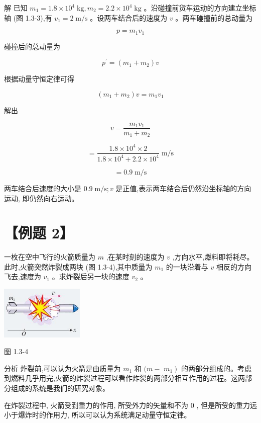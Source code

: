 \documentclass[10pt]{article}
\begin{document}
解 已知 \({m}_{1} = {1.8} \times {10}^{4}\mathrm{\;{kg}},{m}_{2} = {2.2} \times {10}^{4}\mathrm{\;{kg}}\) 。沿碰撞前货车运动的方向建立坐标轴 (图 1.3-3),有 \({v}_{1} = 2\mathrm{\;m}/\mathrm{s}\) 。设两车结合后的速度为 \(v\) 。两车碰撞前的总动量为

\[
p = {m}_{1}{v}_{1}
\]

碰撞后的总动量为

\[
{p}^{\prime } = \left( {{m}_{1} + {m}_{2}}\right) v
\]

根据动量守恒定律可得

\[
\left( {{m}_{1} + {m}_{2}}\right) v = {m}_{1}{v}_{1}
\]

解出

\[
v = \frac{{m}_{1}{v}_{1}}{{m}_{1} + {m}_{2}}
\]

\[
= \frac{{1.8} \times {10}^{4} \times 2}{{1.8} \times {10}^{4} + {2.2} \times {10}^{4}}\mathrm{\;m}/\mathrm{s}
\]

\[
= {0.9}\mathrm{\;m}/\mathrm{s}
\]

两车结合后速度的大小是 \({0.9}\mathrm{\;m}/\mathrm{s};v\) 是正值,表示两车结合后仍然沿坐标轴的方向运动, 即仍然向右运动。

\section*{【例题 2】}

一枚在空中飞行的火箭质量为 \(m\) ,在某时刻的速度为 \(v\) ,方向水平,燃料即将耗尽。此时,火箭突然炸裂成两块 (图 1.3-4),其中质量为 \({m}_{1}\) 的一块沿着与 \(v\) 相反的方向飞去,速度为 \({v}_{1}\) 。求炸裂后另一块的速度 \({v}_{2}\) 。

\begin{center}
\includegraphics[max width=0.3\textwidth]{images/01910e4c-ebb8-7d2c-8f2f-2375bc1d2d12_20_817645.jpg}
\end{center}

图 1.3-4

分析 炸裂前,可以认为火箭是由质量为 \({m}_{1}\) 和 \((m -\) \(\left. {m}_{1}\right)\) 的两部分组成的。考虑到燃料几乎用完,火箭的炸裂过程可以看作炸裂的两部分相互作用的过程。这两部分组成的系统是我们的研究对象。

在炸裂过程中, 火箭受到重力的作用, 所受外力的矢量和不为 0 , 但是所受的重力远小于爆炸时的作用力, 所以可以认为系统满足动量守恒定律。
\end{document}

